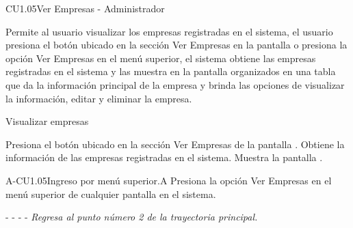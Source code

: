\begin{UseCase}{CU1.05}{Ver Empresas - Administrador }{
    Permite al usuario  visualizar los empresas registradas en el sistema, el usuario presiona el botón  ubicado en la sección  Ver Empresas en la pantalla   o presiona la opción Ver Empresas en el menú superior, el sistema obtiene las empresas registradas en el sistema y  las muestra en la pantalla 
    organizados en una tabla que da la información principal de la empresa y brinda las opciones de visualizar la información, editar y eliminar la empresa. 
    
    \bigskip
}
		
\end{UseCase}
	
	\begin{UCtrayectoria}{Visualizar empresas}
	
	    \UCpaso[\UCactor]Presiona el botón  ubicado en la sección Ver Empresas de la pantalla .
		\UCpaso[\UCsist] Obtiene la información de las empresas registradas en el sistema.
		\UCpaso[\UCsist] Muestra la pantalla . 
       
		
	\end{UCtrayectoria}
	\begin{UCtrayectoriaA}{A-CU1.05}{Ingreso por menú superior.}{A}
	    \UCpaso[\UCactor]Presiona la opción Ver Empresas en el menú superior de cualquier pantalla en el sistema. %
	    \item[- -] - - {\em Regresa al punto número 2 de la trayectoria principal.}
	\end{UCtrayectoriaA}


